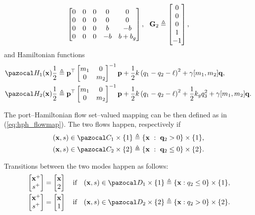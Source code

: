\begin{exmp}
\begin{equation}
\begin{bmatrix}
            0&0&0&0&0\\
            0&0&0&0&0\\
            0&0&0&b&-b\\
            0&0&0&-b&b+b_g\\
        \end{bmatrix},~~
        \mathbf{G}_2\triangleq
        \begin{bmatrix}
            0\\0\\0\\1\\-1
        \end{bmatrix},
    \end{equation}
    and Hamiltonian functions
    \begin{align}
        &\Ha_1(\xb) \frac{1}{2}\triangleq \pb^\top\begin{bmatrix}m_1&0\\0&m_2\end{bmatrix}^{-1}\pb + \frac{1}{2}k\left(q_1-q_2-\ell\right)^2 + \gamma[m_1,m_2]\qb, \\
        &\Ha_2(\xb) \frac{1}{2}\triangleq \pb^\top\begin{bmatrix}m_1&0\\0&m_2\end{bmatrix}^{-1}\pb + \frac{1}{2}k\left(q_1-q_2-\ell\right)^2 + \frac{1}{2}k_g q_3^2+ \gamma[m_1,m_2]\qb.
    \end{align}
    
    The port--Hamiltonian flow set--valued mapping can be then defined as in (\ref{eq:hph_flowmap}). The two flows happen, respectively if 
    \begin{align}
        &(\xb,s)\in\C_1\times\{1\}\triangleq\left\{\xb~:~\q_2>0\right\}\times\{1\},\\
        &(\xb,s)\in\C_2\times\{2\}\triangleq\left\{\xb~:~\q_2\leq0\right\}\times\{2\}.
    \end{align}
    
    Transitions between the two modes happen as follows:
    \begin{align}
        &\begin{bmatrix}\xb^+\\s^+\end{bmatrix} = \begin{bmatrix}\xb\\2\end{bmatrix}\quad\text{if}\quad(\xb,s)\in\D_1\times\{1\}\triangleq\{\xb:q_2\leq 0\}\times\{1\},\\
        &\begin{bmatrix}\xb^+\\s^+\end{bmatrix} = \begin{bmatrix}\xb\\1\end{bmatrix}\quad\text{if}\quad(\xb,s)\in\D_2\times\{2\}\triangleq\{\xb:q_2> 0\}\times\{2\}.
    \end{align}
    

\end{exmp}
